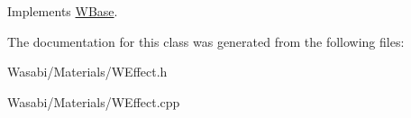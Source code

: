 Implements \hyperlink{class_w_base_a76ac973ba9a43e182f6a6a4869d69725}{W\+Base}.



The documentation for this class was generated from the following files\+:\begin{DoxyCompactItemize}
\item 
Wasabi/\+Materials/W\+Effect.\+h\item 
Wasabi/\+Materials/W\+Effect.\+cpp\end{DoxyCompactItemize}
